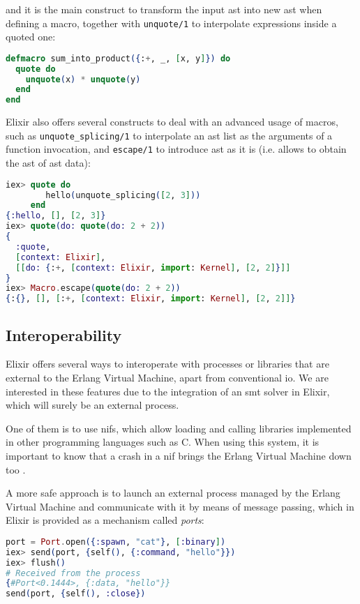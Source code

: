 and it is the main construct to transform the input \gls{ast} into new \gls{ast}
when defining a macro, together with \verb|unquote/1| to interpolate expressions
inside a quoted one:

\begin{lstlisting}[language=elixir,numbers=none,frame=none]
defmacro sum_into_product({:+, _, [x, y]}) do
  quote do
    unquote(x) * unquote(y)
  end
end
\end{lstlisting}

Elixir also offers several constructs to deal with an advanced usage 
of macros, such as \verb|unquote_splicing/1| to interpolate an \gls{ast} list as 
the arguments of a function invocation, and \verb|escape/1| to introduce
\gls{ast} as it is (i.e. allows to obtain the \gls{ast} of \gls{ast} data):

\begin{lstlisting}[language=elixir,numbers=none,frame=none]
iex> quote do
        hello(unquote_splicing([2, 3]))
     end
{:hello, [], [2, 3]}
iex> quote(do: quote(do: 2 + 2))
{
  :quote, 
  [context: Elixir],
  [[do: {:+, [context: Elixir, import: Kernel], [2, 2]}]]
}
iex> Macro.escape(quote(do: 2 + 2))
{:{}, [], [:+, [context: Elixir, import: Kernel], [2, 2]]}
\end{lstlisting}

\subsection{Interoperability}

Elixir offers several ways to interoperate with processes or libraries that are
external to the Erlang Virtual Machine, apart from conventional \gls{io}. We are
interested in these features due to the integration of an \acrshort{smt} solver
in Elixir, which will surely be an external process.

One of them is to use \gls{nif}s, which allow loading and calling libraries
implemented in other programming languages such as C. When using this system,
it is important to know that a crash in a \gls{nif} brings the Erlang Virtual 
Machine down too \citep{ErlangDocs}.

A more safe approach is to launch an external process managed by the Erlang
Virtual Machine and communicate with it by means of message passing, which in 
Elixir is provided as a mechanism called \textit{ports}:

\begin{lstlisting}[language=elixir,numbers=none,frame=none]
port = Port.open({:spawn, "cat"}, [:binary])
iex> send(port, {self(), {:command, "hello"}})
iex> flush()
# Received from the process
{#Port<0.1444>, {:data, "hello"}} 
send(port, {self(), :close})
\end{lstlisting}

